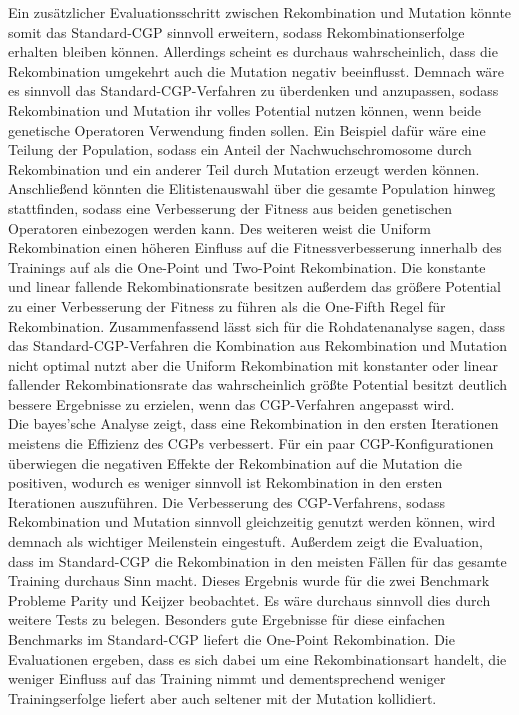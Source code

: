 Ein zusätzlicher Evaluationsschritt zwischen Rekombination und Mutation könnte somit das Standard-CGP sinnvoll erweitern, sodass Rekombinationserfolge erhalten bleiben können.
Allerdings scheint es durchaus wahrscheinlich, dass die Rekombination umgekehrt auch die Mutation negativ beeinflusst.
Demnach wäre es sinnvoll das Standard-CGP-Verfahren zu überdenken und anzupassen, sodass Rekombination und Mutation ihr volles Potential nutzen können, wenn beide genetische Operatoren Verwendung finden sollen.
Ein Beispiel dafür wäre eine Teilung der Population, sodass ein Anteil der Nachwuchschromosome durch Rekombination und ein anderer Teil durch Mutation erzeugt werden können.
Anschließend könnten die Elitistenauswahl über die gesamte Population hinweg stattfinden, sodass eine Verbesserung der Fitness aus beiden genetischen Operatoren einbezogen werden kann.
Des weiteren weist die Uniform Rekombination einen höheren Einfluss auf die Fitnessverbesserung innerhalb des Trainings auf als die One-Point und Two-Point Rekombination.
Die konstante und linear fallende Rekombinationsrate besitzen außerdem das größere Potential zu einer Verbesserung der Fitness zu führen als die One-Fifth Regel für Rekombination.
Zusammenfassend lässt sich für die Rohdatenanalyse sagen, dass das Standard-CGP-Verfahren die Kombination aus Rekombination und Mutation nicht optimal nutzt aber die Uniform Rekombination mit konstanter oder linear fallender Rekombinationsrate das wahrscheinlich größte Potential besitzt deutlich bessere Ergebnisse zu erzielen, wenn das CGP-Verfahren angepasst wird.\\
Die bayes'sche Analyse zeigt, dass eine Rekombination in den ersten Iterationen meistens die Effizienz des CGPs verbessert.
Für ein paar CGP-Konfigurationen überwiegen die negativen Effekte der Rekombination auf die Mutation die positiven, wodurch es weniger sinnvoll ist Rekombination in den ersten Iterationen auszuführen.
Die Verbesserung des CGP-Verfahrens, sodass Rekombination und Mutation sinnvoll gleichzeitig genutzt werden können, wird demnach als wichtiger Meilenstein eingestuft.
Außerdem zeigt die Evaluation, dass im Standard-CGP die Rekombination in den meisten Fällen für das gesamte Training durchaus Sinn macht.
Dieses Ergebnis wurde für die zwei Benchmark Probleme Parity und Keijzer beobachtet.
Es wäre durchaus sinnvoll dies durch weitere Tests zu belegen.
Besonders gute Ergebnisse für diese einfachen Benchmarks im Standard-CGP liefert die One-Point Rekombination.
Die Evaluationen ergeben, dass es sich dabei um eine Rekombinationsart handelt, die weniger Einfluss auf das Training nimmt und dementsprechend weniger Trainingserfolge liefert aber auch seltener mit der Mutation kollidiert.
